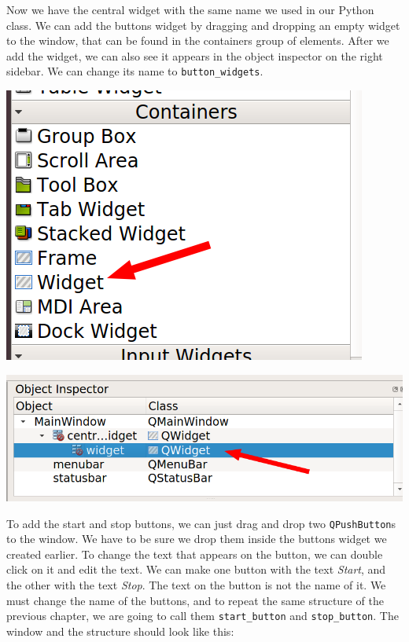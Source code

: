 Now we have the central widget with the same name we used in our Python class. We can add the buttons widget by dragging and dropping an empty widget to the window, that can be found in the containers group of elements. After we add the widget, we can also see it appears in the object inspector on the right sidebar. We can change its name to \texttt{button\_widgets}.

\begin{minipage}{0.45\linewidth}
    \centering
    \includegraphics[width=\textwidth]{images/Chapter_09/04_empty_widget.png}
\end{minipage}
\hspace{0.5cm}
\begin{minipage}{0.45\linewidth}
    \centering
    \includegraphics[width=\textwidth]{images/Chapter_09/04_empty_widget_structure.png}
\end{minipage}

To add the start and stop buttons, we can just drag and drop two \texttt{QPushButton}s to the window. We have to be sure we drop them inside the buttons widget we created earlier. To change the text that appears on the button, we can double click on it and edit the text. We can make one button with the text \emph{Start}, and the other with the text \emph{Stop}. The text on the button is not the name of it. We must change the name of the buttons, and to repeat the same structure of the previous chapter, we are going to call them \texttt{start\_button} and \texttt{stop\_button}. The window and the structure should look like this:

